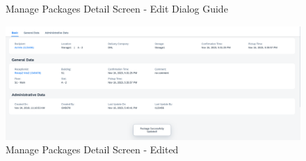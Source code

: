 \begin{figure}[H]
    \hspace{5pt}
    \caption{Manage Packages Detail Screen - Edit Dialog Guide}
	\label{fig:MPDetailEditBtn}
\end{figure}


\begin{figure}[H]
	\centering
	\includegraphics[width=1\linewidth]{images/user_doc/managePack/DetailScreen/edit/editToast.png}
	\caption{Manage Packages Detail Screen - Edited}
	\label{fig:MPReportEditDone}
\end{figure}

